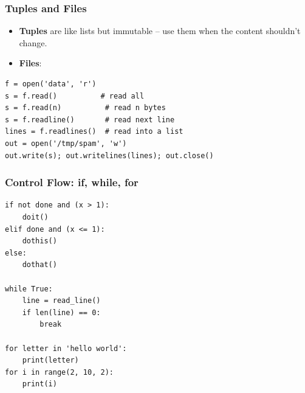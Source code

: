 \begin{frame}[fragile]\frametitle{Tuples and Files}
	\begin{itemize}
	\item \textbf{Tuples} are like lists but immutable -- use them when the content shouldn't change.
	\item \textbf{Files}:
	\end{itemize}
\begin{lstlisting}
f = open('data', 'r')
s = f.read()          # read all
s = f.read(n)          # read n bytes
s = f.readline()       # read next line
lines = f.readlines()  # read into a list
out = open('/tmp/spam', 'w')
out.write(s); out.writelines(lines); out.close()
\end{lstlisting}
\end{frame}


\begin{frame}[fragile]\frametitle{Control Flow: if, while, for}
\begin{lstlisting}
if not done and (x > 1):
    doit()
elif done and (x <= 1):
    dothis()
else:
    dothat()

while True:
    line = read_line()
    if len(line) == 0:
        break

for letter in 'hello world':
    print(letter)
for i in range(2, 10, 2):
    print(i)
\end{lstlisting}
\end{frame}



